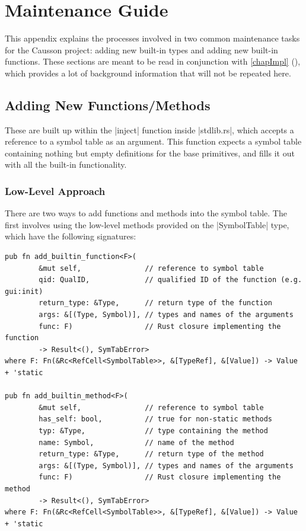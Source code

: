 \documentclass[11pt]{report}
\begin{document}
\chapter{Maintenance Guide} \label{adxMaint}

This appendix explains the processes involved in two common maintenance tasks for the Causson project: adding new built-in types and adding new built-in functions. These sections are meant to be read in conjunction with \cref{chapImpl} (\emph{}), which provides a lot of background information that will not be repeated here.

\section{Adding New Functions/Methods}

These are built up within the |inject| function inside |stdlib.rs|, which accepts a reference to a symbol table as an argument. This function expects a symbol table containing nothing but empty definitions for the base primitives, and fills it out with all the built-in functionality.

\subsection{Low-Level Approach}

There are two ways to add functions and methods into the symbol table.  The first involves using the low-level methods provided on the |SymbolTable| type, which have the following signatures:

\begin{verbatim}
pub fn add_builtin_function<F>(
        &mut self,               // reference to symbol table
        qid: QualID,             // qualified ID of the function (e.g. gui:init)
        return_type: &Type,      // return type of the function
        args: &[(Type, Symbol)], // types and names of the arguments
        func: F)                 // Rust closure implementing the function
        -> Result<(), SymTabError>
where F: Fn(&Rc<RefCell<SymbolTable>>, &[TypeRef], &[Value]) -> Value + 'static

pub fn add_builtin_method<F>(
        &mut self,               // reference to symbol table
        has_self: bool,          // true for non-static methods
        typ: &Type,              // type containing the method
        name: Symbol,            // name of the method
        return_type: &Type,      // return type of the method
        args: &[(Type, Symbol)], // types and names of the arguments
        func: F)                 // Rust closure implementing the method
        -> Result<(), SymTabError>
where F: Fn(&Rc<RefCell<SymbolTable>>, &[TypeRef], &[Value]) -> Value + 'static
\end{verbatim}
\end{document}
